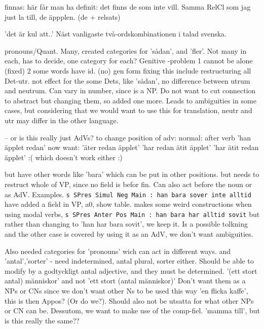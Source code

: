 \documentclass{report}
\begin{document}
finnas: här får man ha definit: det finns de som inte vill. Samma RelCl som
jag just la till, de äppplen. (de + relsats)

'det är kul att..' Näst vanligaste två-ordskombinationen i talad svenska.
% 



pronouns/Quant. Many, created categories for 'sådan', and 'fler'. Not many in each,
has to decide, one category for each?
Genitive -problem 1 cannot be alone (fixed) 2 some words have id. (no) gen form
           fixing this include restructuring all
Det-utr. not effect for the some Dets, like 'sådan', no difference between utrum and neutrum.
 Can vary in number, since is a NP. Do not want to cut connection to abstract but changing them,
 so added one more. Leads to ambiguities in some cases, but considering that we would want to use
 this for translation, neutr and utr may differ in the other language.

-- or is this really just AdVs? 
to change position of adv:
normal: after verb 'han äpplet redan'
now want: 'äter redan äpplet'
          'har redan ätit äpplet' 
          'har ätit redan äpplet' :( which doesn't work either :)

but have other words like 'bara' which can be put in other positions.
  but needs to restruct whole of VP, since no field is befor fin.
  Can also act before the noun or as AdV. Examples.
\verb|s SPres Simul Neg Main : han bara sover inte alltid|
  have added a field in VP, a0, show table.
  makes some weird constructions when using modal verbs, 
  \verb|s SPres Anter Pos Main : han bara har alltid sovit|
  but rather than changing to 'han har bara sovit', we keep it. Is a possible
  tolkning and the other case is covered by using it as an AdV, we don't want
  ambiguities.

Also needed categories for 'pronouns' wich can act in different ways.
and 'antal','sorter' - need indetermined, antal plural, sorter either.
Should be able to modify by a godtyckligt antal adjective, and they must be determined.
'(ett stort antal) människor' and not 'ett stort (antal människor)'
Don't want them as a NPs or CNs since we don't want other Ns to be used this way
'en flicka kaffe', this is then Appos? (Or do we?). Should also not be utsatta for what other
NPs or CN can be. Dessutom, we want to make use of the comp-fiel. 'mamma till', but is this really
the same??
\end{document}

